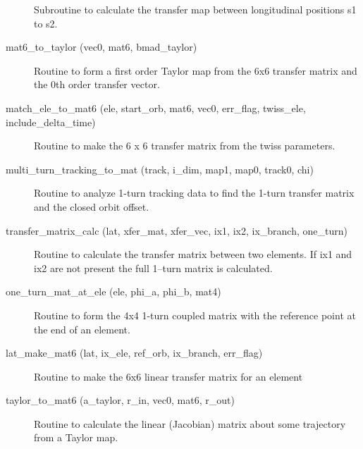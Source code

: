 \begin{description}
\label{r:mat6.from.s.to.s}
\item[\protect\parbox{6in}{
    mat6_from_s_to_s (lat, mat6, vec0, s1, s2, orbit, ix_branch, one_turn, \\
    \hspace*{1in} unit_start, err_flag, ele_save)} ] \Newline 
Subroutine to calculate the transfer map between longitudinal positions
s1 to s2.

\item[mat6_to_taylor (vec0, mat6, bmad_taylor)] \Newline
Routine to form a first order Taylor map from the 6x6 transfer matrix 
and the 0th order transfer vector. 

\label{r:match.ele.to.mat6}
\item[match_ele_to_mat6 (ele, start_orb, mat6, vec0, err_flag, twiss_ele, include_delta_time)] \Newline 
Routine to make the 6 x 6 transfer matrix from the twiss parameters.

\item[multi_turn_tracking_to_mat (track, i_dim, map1, map0, track0, chi)] \Newline
Routine to analyze 1-turn tracking data to find the 1-turn transfer matrix 
and the closed orbit offset.

\label{r:transfer.matrix.calc}
\item[transfer_matrix_calc (lat, xfer_mat, xfer_vec, ix1, ix2, ix_branch, one_turn)] \Newline
Routine to calculate the transfer matrix between two elements. If
ix1 and ix2 are not present the full 1--turn matrix is calculated.

\label{r:one.turn.mat.at.ele}
\item[one_turn_mat_at_ele (ele, phi_a, phi_b, mat4)] \Newline
Routine to form the 4x4 1-turn coupled matrix with the reference point 
at the end of an element. 

\label{r:lat.make.mat6}
\item[lat_make_mat6 (lat, ix_ele, ref_orb, ix_branch, err_flag)] \Newline
Routine to make the 6x6 linear transfer matrix for an element 

\item[taylor_to_mat6 (a_taylor, r_in, vec0, mat6, r_out)] \Newline
Routine to calculate the linear (Jacobian) matrix about some trajectory from a Taylor map. 


\end{description}
